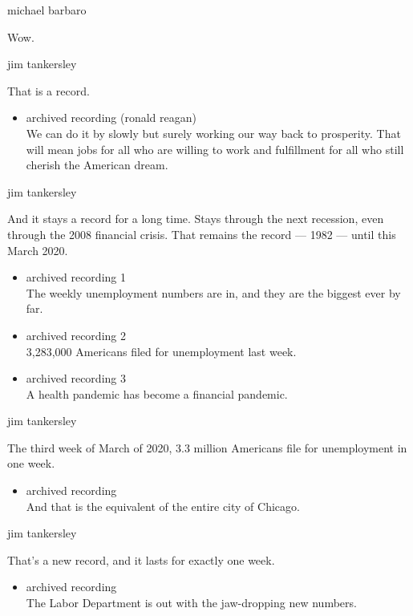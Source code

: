 michael barbaro

Wow.

jim tankersley

That is a record.

\begin{itemize}
\tightlist
\item
  archived recording (ronald reagan)\\
  We can do it by slowly but surely working our way back to prosperity.
  That will mean jobs for all who are willing to work and fulfillment
  for all who still cherish the American dream.
\end{itemize}

jim tankersley

And it stays a record for a long time. Stays through the next recession,
even through the 2008 financial crisis. That remains the record --- 1982
--- until this March 2020.

\begin{itemize}
\item
  archived recording 1\\
  The weekly unemployment numbers are in, and they are the biggest ever
  by far.
\item
  archived recording 2\\
  3,283,000 Americans filed for unemployment last week.
\item
  archived recording 3\\
  A health pandemic has become a financial pandemic.
\end{itemize}

jim tankersley

The third week of March of 2020, 3.3 million Americans file for
unemployment in one week.

\begin{itemize}
\tightlist
\item
  archived recording\\
  And that is the equivalent of the entire city of Chicago.
\end{itemize}

jim tankersley

That's a new record, and it lasts for exactly one week.

\begin{itemize}
\tightlist
\item
  archived recording\\
  The Labor Department is out with the jaw-dropping new numbers.
\end{itemize}


